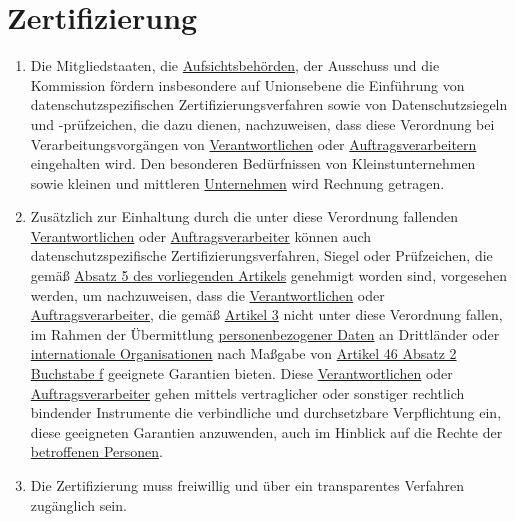 \chapter{Zertifizierung}
\label{ch:42}


\begin{enumerate}

  \item Die Mitgliedstaaten, die \hyperref[itm:04-21]{Aufsichtsbehörden}, der Ausschuss und die Kommission fördern
   insbesondere auf Unionsebene die Einführung von datenschutzspezifischen Zertifizierungsverfahren sowie von
   Datenschutzsiegeln und -prüfzeichen, die dazu dienen, nachzuweisen, dass diese Verordnung bei Verarbeitungsvorgängen
   von
   \hyperref[itm:04-7]{Verantwortlichen} oder \hyperref[itm:04-8]{Auftragsverarbeitern} eingehalten wird. Den besonderen
    Bedürfnissen von Kleinstunternehmen sowie kleinen und mittleren \hyperref[itm:04-18]{Unternehmen} wird Rechnung
    getragen.%
  \label{itm:42-1}

  \item Zusätzlich zur Einhaltung durch die unter diese Verordnung fallenden \hyperref[itm:04-7]
   {Verantwortlichen} oder \hyperref[itm:04-8]{Auftragsverarbeiter} können auch datenschutzspezifische
   Zertifizierungsverfahren, Siegel oder Prüfzeichen, die gemäß \hyperref[itm:42-5]{Absatz 5 des vorliegenden Artikels}
   genehmigt worden sind, vorgesehen werden, um nachzuweisen, dass die
   \hyperref[itm:04-7]{Verantwortlichen} oder \hyperref[itm:04-8]{Auftragsverarbeiter}, die gemäß \hyperref[ch:3]
    {Artikel 3} nicht unter diese Verordnung fallen, im Rahmen der Übermittlung \hyperref[itm:04-1]
    {personenbezogener Daten} an Drittländer oder \hyperref[itm:04-29]{internationale Organisationen} nach Maßgabe
    von \hyperref[itm:46-2f]{Artikel 46 Absatz 2 Buchstabe f} geeignete Garantien bieten. Diese \hyperref[itm:04-7]
    {Verantwortlichen} oder \hyperref[itm:04-8]{Auftragsverarbeiter} gehen mittels vertraglicher oder sonstiger
    rechtlich bindender Instrumente die verbindliche und durchsetzbare Verpflichtung ein, diese geeigneten Garantien
    anzuwenden, auch im Hinblick auf die Rechte der
   \hyperref[itm:04-1]{betroffenen Personen}.%
  \label{itm:42-2}

  \item Die Zertifizierung muss freiwillig und über ein transparentes Verfahren zugänglich sein.%
  \label{itm:42-3}


\end{enumerate}
